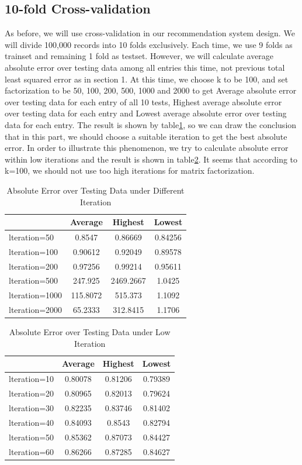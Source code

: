 \documentclass{article}
\begin{document}
\subsection{10-fold Cross-validation}
As before, we will use cross-validation in our recommendation system design. We will divide 100,000 records into 10 folds exclusively. Each time, we use 9 folds as trainset and remaining 1 fold as testset. However, we will calculate average absolute error over testing data among all entries this time, not previous total least squared error as in section 1. At this time, we choose k to be 100, and set factorization to be 50, 100, 200, 500, 1000 and 2000 to get Average absolute error over testing data for each entry of all 10 tests, Highest average absolute error over testing data for each entry and Lowest average absolute error over testing data for each entry. The result is shown by table\ref{tb:p2}, so we can draw the conclusion that in this part, we should choose a suitable iteration to get the best absolute error. In order to illustrate this phenomenon, we try to calculate absolute error within low iterations and the result is shown in table\ref{tb:p22}. It seems that according to k=100, we should not use too high iterations for matrix factorization.
\begin{table}
\begin{center}
\caption{Absolute Error over Testing Data under Different Iteration}
\label{tb:p2}
\begin{tabular}{|l||c|c|c|}
\hline
 & Average& Highest & Lowest\\
\hline
lteration=50&0.8547&0.86669&0.84256\\
lteration=100&0.90612&0.92049&0.89578\\
lteration=200&0.97256&0.99214&0.95611\\
lteration=500&247.925&2469.2667&1.0425\\
lteration=1000&115.8072&515.373&1.1092\\
lteration=2000&65.2333&312.8415&1.1706\\
\hline
\end{tabular}
\end{center}
\end{table}

\begin{table}
\begin{center}
\caption{Absolute Error over Testing Data under Low Iteration}
\label{tb:p22}
\begin{tabular}{|l||c|c|c|}
\hline
 & Average& Highest & Lowest\\
\hline
lteration=10&0.80078&0.81206&0.79389\\
lteration=20&0.80965&0.82013&0.79624\\
lteration=30&0.82235&0.83746&0.81402\\
lteration=40&0.84093&0.8543&0.82794\\
lteration=50&0.85362&0.87073&0.84427\\
lteration=60&0.86266&0.87285&0.84627\\
\hline
\end{tabular}
\end{center}
\end{table}
\end{document}
